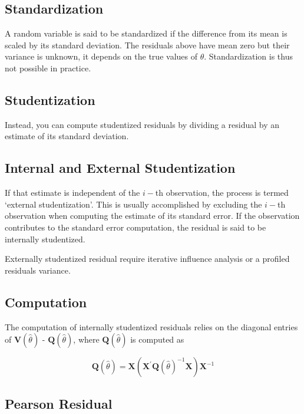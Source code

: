 \documentclass[12pt, a4paper]{report}
\theoremstyle{plain}
\theoremstyle{definition}
\theoremstyle{remark}
\begin{document}
\subsection{Standardization} %

A random variable is said to be standardized if the difference from its mean is scaled by its standard deviation. The residuals above have mean zero but their variance is unknown, it depends on the true values of $\theta$. Standardization is thus not possible in practice.

\subsection{Studentization} %
Instead, you can compute studentized residuals by dividing a residual by an estimate of its standard deviation. 

\subsection{Internal and External Studentization} %
If that estimate is independent of the $i-$th observation, the process is termed `external studentization'. This is usually accomplished by excluding the $i-$th observation when computing the estimate of its standard error. If the observation contributes to the
standard error computation, the residual is said to be internally studentized.

Externally  studentized residual require iterative influence analysis or a profiled residuals variance.


\subsection{Computation}%

The computation of internally studentized residuals relies on the diagonal entries of $\boldsymbol{V} (\hat{\theta})$ - $\boldsymbol{Q} (\hat{\theta})$, where $\boldsymbol{Q} (\hat{\theta})$ is computed as

\[ \boldsymbol{Q} (\hat{\theta}) = \boldsymbol{X} ( \boldsymbol{X}^{\prime}\boldsymbol{Q} (\hat{\theta})^{-1}\boldsymbol{X})\boldsymbol{X}^{-1} \]

\subsection{Pearson Residual}%
\end{document}
